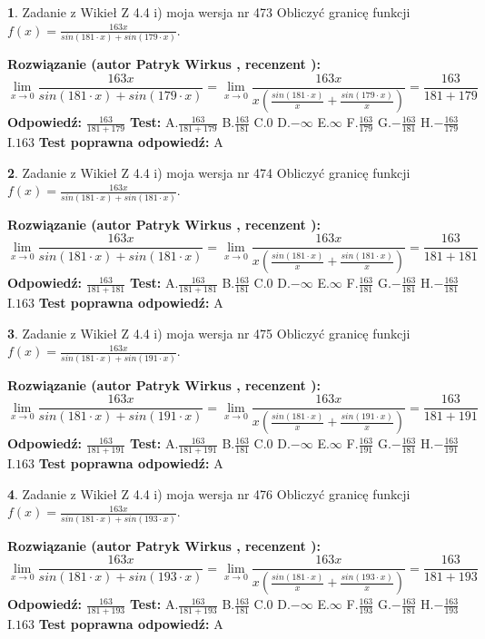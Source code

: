 \documentclass[12pt, a4paper]{article}
\theoremstyle{definition} %
\newtheorem{zad}{}
\newcommand{\zadStart}[1]{\begin{zad}#1\newline}
\newcommand{\zadStop}{\end{zad}}
\newcommand{\rozwStart}[2]{\noindent \textbf{Rozwiązanie (autor #1 , recenzent #2): }\newline}
\newcommand{\rozwStop}{\newline}
\newcommand{\odpStart}{\noindent \textbf{Odpowiedź:}\newline}
\newcommand{\odpStop}{\newline}
\newcommand{\testStart}{\noindent \textbf{Test:}\newline}
\newcommand{\testStop}{\newline}
\newcommand{\kluczStart}{\noindent \textbf{Test poprawna odpowiedź:}\newline}
\newcommand{\kluczStop}{\newline}
\begin{document}
\zadStart{Zadanie z Wikieł Z 4.4 i) moja wersja nr 473}
Obliczyć granicę funkcji $f(x)=\frac{163x}{sin(181\cdot x) +sin(179\cdot x)}$.
\zadStop
\rozwStart{Patryk Wirkus}{}
$$\lim\limits_{x\to 0}\frac{163x}{sin(181\cdot x) +sin(179\cdot x)}=\lim\limits_{x\to 0}\frac{163x}{x(\frac{sin(181\cdot x)}{x}+\frac{sin(179\cdot x)}{x})}=\frac{163}{181+179}$$
\rozwStop
\odpStart
$\frac{163}{181+179}$
\odpStop
\testStart
A.$\frac{163}{181+179}$
B.$\frac{163}{181}$
C.$0$
D.$-\infty$
E.$\infty$
F.$\frac{163}{179}$
G.$-\frac{163}{181}$
H.$-\frac{163}{179}$
I.$163$
\testStop
\kluczStart
A
\kluczStop



\zadStart{Zadanie z Wikieł Z 4.4 i) moja wersja nr 474}
Obliczyć granicę funkcji $f(x)=\frac{163x}{sin(181\cdot x) +sin(181\cdot x)}$.
\zadStop
\rozwStart{Patryk Wirkus}{}
$$\lim\limits_{x\to 0}\frac{163x}{sin(181\cdot x) +sin(181\cdot x)}=\lim\limits_{x\to 0}\frac{163x}{x(\frac{sin(181\cdot x)}{x}+\frac{sin(181\cdot x)}{x})}=\frac{163}{181+181}$$
\rozwStop
\odpStart
$\frac{163}{181+181}$
\odpStop
\testStart
A.$\frac{163}{181+181}$
B.$\frac{163}{181}$
C.$0$
D.$-\infty$
E.$\infty$
F.$\frac{163}{181}$
G.$-\frac{163}{181}$
H.$-\frac{163}{181}$
I.$163$
\testStop
\kluczStart
A
\kluczStop



\zadStart{Zadanie z Wikieł Z 4.4 i) moja wersja nr 475}
Obliczyć granicę funkcji $f(x)=\frac{163x}{sin(181\cdot x) +sin(191\cdot x)}$.
\zadStop
\rozwStart{Patryk Wirkus}{}
$$\lim\limits_{x\to 0}\frac{163x}{sin(181\cdot x) +sin(191\cdot x)}=\lim\limits_{x\to 0}\frac{163x}{x(\frac{sin(181\cdot x)}{x}+\frac{sin(191\cdot x)}{x})}=\frac{163}{181+191}$$
\rozwStop
\odpStart
$\frac{163}{181+191}$
\odpStop
\testStart
A.$\frac{163}{181+191}$
B.$\frac{163}{181}$
C.$0$
D.$-\infty$
E.$\infty$
F.$\frac{163}{191}$
G.$-\frac{163}{181}$
H.$-\frac{163}{191}$
I.$163$
\testStop
\kluczStart
A
\kluczStop



\zadStart{Zadanie z Wikieł Z 4.4 i) moja wersja nr 476}
Obliczyć granicę funkcji $f(x)=\frac{163x}{sin(181\cdot x) +sin(193\cdot x)}$.
\zadStop
\rozwStart{Patryk Wirkus}{}
$$\lim\limits_{x\to 0}\frac{163x}{sin(181\cdot x) +sin(193\cdot x)}=\lim\limits_{x\to 0}\frac{163x}{x(\frac{sin(181\cdot x)}{x}+\frac{sin(193\cdot x)}{x})}=\frac{163}{181+193}$$
\rozwStop
\odpStart
$\frac{163}{181+193}$
\odpStop
\testStart
A.$\frac{163}{181+193}$
B.$\frac{163}{181}$
C.$0$
D.$-\infty$
E.$\infty$
F.$\frac{163}{193}$
G.$-\frac{163}{181}$
H.$-\frac{163}{193}$
I.$163$
\testStop
\kluczStart
A
\kluczStop
\end{document}
